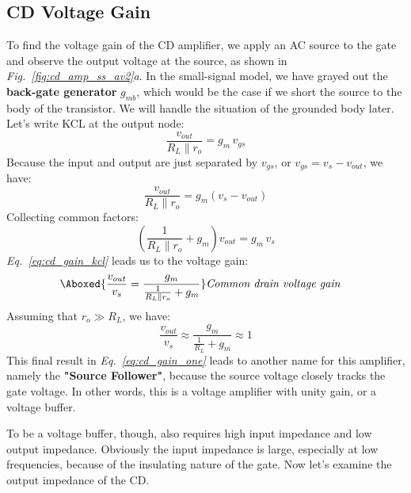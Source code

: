 \subsection{CD Voltage Gain}
To find the voltage gain of the CD amplifier, we apply an AC source to the gate and observe the output voltage at the source, as shown in \emph{Fig.~\ref{fig:cd_amp_ss_av2}a}.  In the small-signal model, we have grayed out the \textbf{back-gate generator} $g_{mb}$, which would be the case if we short the source to the body of the transistor.  We will handle the situation of the grounded body later. Let's write KCL at the output node:
    \begin{equation*}
        \frac{v_{out}}{R_L \parallel r_o} = g_m\,v_{gs}
    \end{equation*}
Because the input and output are just separated by $v_{gs}$, or $v_{gs} = v_{s} - v_{out}$, we have:
    \begin{equation*}
        \frac{v_{out}}{R_L \parallel r_o} = g_m(v_s - v_{out})
    \end{equation*}
Collecting common factors:
    \begin{equation}
        \left(\frac{1}{R_L \parallel r_o} + g_m\right)v_{out} = g_m\,v_s
        \label{eq:cd_gain_kcl}
    \end{equation}
\emph{Eq.~\ref{eq:cd_gain_kcl}} leads us to the voltage gain:
    \begin{align}
        \Aboxed{\frac{v_{out}}{v_s} = \frac{g_m}{\frac{1}{R_L \parallel r_o} + g_m}} &\textit{Common drain voltage gain}
    \end{align}
Assuming that $r_o \gg R_L$, we have:
    \begin{equation}
        \frac{v_{out}}{v_s} \approx \frac{g_m}{\frac{1}{R_L} + g_m} \approx 1
        \label{eq:cd_gain_one}
    \end{equation}
This final result in \emph{Eq.~\ref{eq:cd_gain_one}} leads to another name for this amplifier, namely the \textbf{"Source Follower"}, because the source voltage closely tracks the gate voltage.  In other words, this is a voltage amplifier with unity gain, or a voltage buffer.

To be a voltage buffer, though, also requires high input impedance and low output impedance.  Obviously the input impedance is large, especially at low frequencies, because of the insulating nature of the gate.  Now let's examine the output impedance of the CD.
